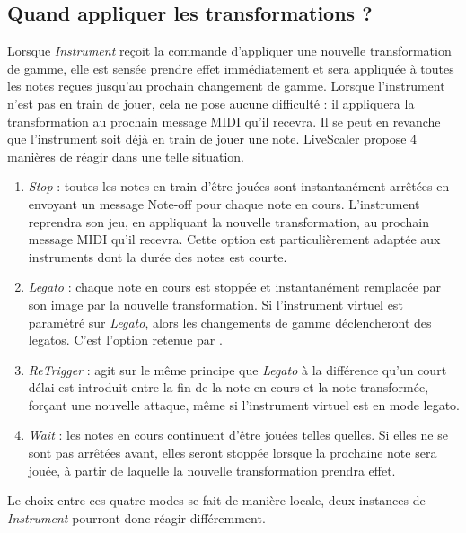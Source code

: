 \subsection{Quand appliquer les transformations ? }
Lorsque \emph{Instrument} reçoit la commande d'appliquer une nouvelle transformation de gamme, elle est sensée prendre effet immédiatement et sera appliquée à toutes les notes reçues jusqu'au prochain changement de gamme. Lorsque l'instrument n'est pas en train de jouer, cela ne pose aucune difficulté : il appliquera la transformation au prochain message MIDI qu'il recevra. Il se peut en revanche que l'instrument soit déjà en train de jouer une note. LiveScaler propose $4$ manières de réagir dans une telle situation. 


\begin{enumerate}
  \item \emph{Stop} : toutes les notes en train d'être jouées sont instantanément arrêtées en envoyant un message Note-off pour chaque note en cours. L'instrument reprendra son jeu, en appliquant la nouvelle transformation, au prochain message MIDI qu'il recevra. Cette option est particulièrement adaptée aux instruments dont la durée des notes est courte. 
  \item \emph{Legato} : chaque note en cours est stoppée et instantanément remplacée par son image par la nouvelle transformation. Si l'instrument virtuel est paramétré sur \emph{Legato}, alors les changements de gamme déclencheront des legatos. C'est l'option retenue par \textcite{Livingstone_Muhlberger_Brown_Thompson_2010}.
  \item \emph{ReTrigger} : agit sur le même principe que \emph{Legato} à la différence  qu'un court délai est introduit entre la fin de la note en cours et la note transformée, forçant une nouvelle attaque, même si l'instrument virtuel est en mode legato.
  \item \emph{Wait} : les notes en cours continuent d'être jouées telles quelles. Si elles ne se sont pas arrêtées avant, elles seront stoppée lorsque la prochaine note sera jouée, à partir de laquelle la nouvelle transformation prendra effet.
\end{enumerate}

Le choix entre ces quatre modes se fait de manière locale, deux instances de \emph{Instrument} pourront donc réagir différemment.
